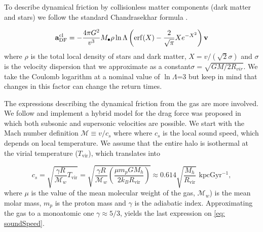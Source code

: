 \documentclass[fleqn,usenatbib]{mnras}
\begin{document}
To describe dynamical friction by collisionless matter components (dark matter and stars) we follow the standard Chandrasekhar formula \citep{binney2011galactic, madau2004effect, tanaka2009assembly, choksi2017recoiling}.

\begin{equation}\label{eq: df_cl}
	{\bf{a}}_\text{DF}^\text{cl} = -\frac{4\pi G^2}{v^3} M_{\bullet} \rho \ln\Lambda\left({\rm erf}(X) - \dfrac{2}{\sqrt{\pi}}Xe^{-X^2}\right){\bf v}
\end{equation}
where $\rho$ is the total local density of stars and dark matter, $X = v/(\sqrt{2}\sigma)$ and $\sigma $ is the velocity dispersion that we approximate as a constant$\sigma = \sqrt{GM/2R_{vir}}$.
We take the Coulomb logarithm at a nominal value of $\ln\Lambda$=3 but keep in mind that changes in this factor can change the return times.

The expressions describing the dynamical friction from the gas are more involved.
We follow \cite{tanaka2009assembly} and implement a hybrid model for the drag force was proposed in which both subsonic and supersonic velocities are possible. We start with the Mach number definition $\mathcal{M} \equiv {v}/{c_s}$ where 
where $c_s$ is the local sound speed, which depends on local temperature. 
We assume that the entire halo is isothermal at the virial temperature ($T_\text{vir}$), which translates into

\begin{equation}\label{eq: soundSpeed}
c_s = \sqrt{\dfrac{\gamma R}{\mathcal{M}_w}T_\text{vir}} = 
\sqrt{\dfrac{\gamma R}{\mathcal{M}_w}\left(\dfrac{\mu m_p G M_h}{2k_BR_\text{vir}}\right)} 
\approx 0.614 \sqrt{\dfrac{M_h}{R_\text{vir}}}\text{ kpcGyr$^{-1}$},
\end{equation}
%	
where $\mu$ is the value of the mean molecular weight of the gas, $\mathcal{M}_w$) is the mean molar mass, $m_p$ is the proton mass and $\gamma$ is the adiabatic index. 
Approximating the gas to a monoatomic one $\gamma \approx 5/3$, yields the last expression on \autoref{eq: soundSpeed}. 
\end{document}
